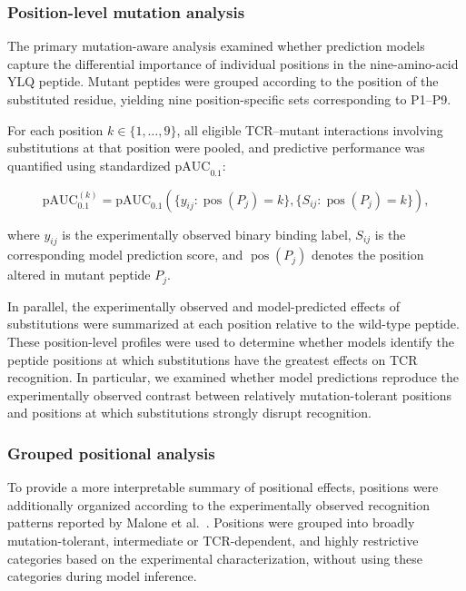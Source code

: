\subsubsection{Position-level mutation analysis}

The primary mutation-aware analysis examined whether prediction models capture
the differential importance of individual positions in the nine-amino-acid
YLQ peptide. Mutant peptides were grouped according to the position of the
substituted residue, yielding nine position-specific sets corresponding to
P1--P9.

For each position $k \in \{1,\ldots,9\}$, all eligible TCR--mutant
interactions involving substitutions at that position were pooled, and
predictive performance was quantified using standardized
$\mathrm{pAUC}_{0.1}$:

\begin{equation}
\mathrm{pAUC}_{0.1}^{(k)}
=
\mathrm{pAUC}_{0.1}
\left(
\{y_{ij}: \operatorname{pos}(P_j)=k\},
\{S_{ij}: \operatorname{pos}(P_j)=k\}
\right),
\label{eq:position_pauc}
\end{equation}

where $y_{ij}$ is the experimentally observed binary binding label,
$S_{ij}$ is the corresponding model prediction score, and
$\operatorname{pos}(P_j)$ denotes the position altered in mutant peptide
$P_j$.

In parallel, the experimentally observed and model-predicted effects of
substitutions were summarized at each position relative to the wild-type
peptide. These position-level profiles were used to determine whether models
identify the peptide positions at which substitutions have the greatest
effects on TCR recognition. In particular, we examined whether model
predictions reproduce the experimentally observed contrast between relatively
mutation-tolerant positions and positions at which substitutions strongly
disrupt recognition.


\subsubsection{Grouped positional analysis}

To provide a more interpretable summary of positional effects, positions were
additionally organized according to the experimentally observed recognition
patterns reported by Malone et al.~\cite{malone2025fingerprinting}. Positions
were grouped into broadly mutation-tolerant, intermediate or TCR-dependent,
and highly restrictive categories based on the experimental characterization,
without using these categories during model inference.

